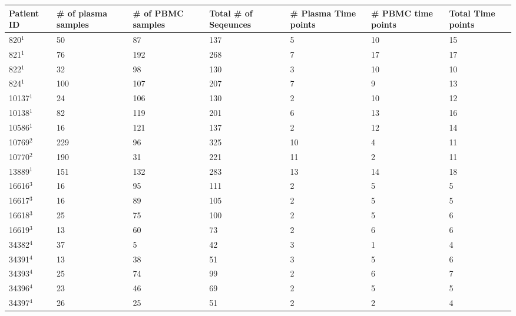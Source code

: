 \begin{table*}[!ht]\label{tab:patients} 
\def\arraystretch{1.3}%
\begin{tabularx}{\textwidth}{ X | X | X | X | X | X | X } 
\hline
\hline
Patient ID & \# of plasma samples & \# of PBMC samples & Total \# of Seqeunces & \# Plasma Time points & \# PBMC time points & Total Time points   \\ \hline \hline
820$^1$ &       50 &       87 &      137 &        5 &       10 &       15  \\
821$^1$ &       76 &      192 &      268 &        7 &       17 &       17   \\ 
822$^1$ &       32 &       98 &      130 &        3 &       10 &       10   \\ 
824$^1$ &      100 &      107 &      207 &        7 &        9 &       13   \\ 
10137$^1$ &       24 &      106 &      130 &        2 &       10 &       12  \\ 
10138$^1$ &       82 &      119 &      201 &        6 &       13 &       16  \\
10586$^1$ &       16 &      121 &      137 &        2 &       12 &       14  \\ 
10769$^2$ &      229 &       96 &      325 &       10 &        4 &       11  \\ 
10770$^2$ &      190 &       31 &      221 &       11 &        2 &       11  \\ 
13889$^1$ &      151 &      132 &      283 &       13 &       14 &       18  \\ 
16616$^3$ &       16 &       95 &      111 &        2 &        5 &        5  \\ 
16617$^3$ &       16 &       89 &      105 &        2 &        5 &        5  \\ 
16618$^3$ &       25 &       75 &      100 &        2 &        5 &        6  \\ 
16619$^3$ &       13 &       60 &       73 &        2 &        6 &        6  \\ 
34382$^4$ &       37 &        5 &       42 &        3 &        1 &        4  \\ 
34391$^4$ &       13 &       38 &       51 &        3 &        5 &        6  \\ 
34393$^4$ &       25 &       74 &       99 &        2 &        6 &        7  \\ 
34396$^4$ &       23 &       46 &       69 &        2 &        5 &        5 \\ 
34397$^4$ &       26 &       25 &       51 &        2 &        2 &        4  \\ 

\end{tabularx}
\end{table*}
